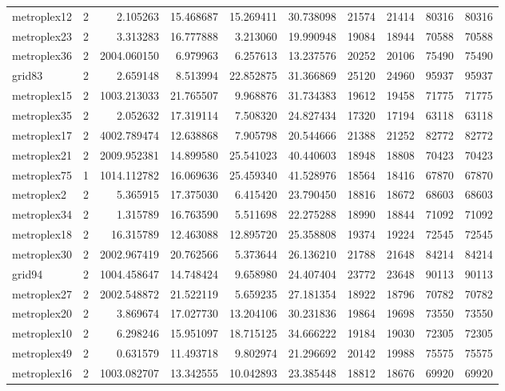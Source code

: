 \begin{longtable}{|l|r|r|r|r|r|r|r|r|r|}
metroplex12 & 2 & 2.105263 & 15.468687 & 15.269411 & 30.738098 & 21574 & 21414 & 80316 & 80316 \\
metroplex23 & 2 & 3.313283 & 16.777888 & 3.213060 & 19.990948 & 19084 & 18944 & 70588 & 70588 \\
metroplex36 & 2 & 2004.060150 & 6.979963 & 6.257613 & 13.237576 & 20252 & 20106 & 75490 & 75490 \\
grid83 & 2 & 2.659148 & 8.513994 & 22.852875 & 31.366869 & 25120 & 24960 & 95937 & 95937 \\
metroplex15 & 2 & 1003.213033 & 21.765507 & 9.968876 & 31.734383 & 19612 & 19458 & 71775 & 71775 \\
metroplex35 & 2 & 2.052632 & 17.319114 & 7.508320 & 24.827434 & 17320 & 17194 & 63118 & 63118 \\
metroplex17 & 2 & 4002.789474 & 12.638868 & 7.905798 & 20.544666 & 21388 & 21252 & 82772 & 82772 \\
metroplex21 & 2 & 2009.952381 & 14.899580 & 25.541023 & 40.440603 & 18948 & 18808 & 70423 & 70423 \\
metroplex75 & 1 & 1014.112782 & 16.069636 & 25.459340 & 41.528976 & 18564 & 18416 & 67870 & 67870 \\
metroplex2 & 2 & 5.365915 & 17.375030 & 6.415420 & 23.790450 & 18816 & 18672 & 68603 & 68603 \\
metroplex34 & 2 & 1.315789 & 16.763590 & 5.511698 & 22.275288 & 18990 & 18844 & 71092 & 71092 \\
metroplex18 & 2 & 16.315789 & 12.463088 & 12.895720 & 25.358808 & 19374 & 19224 & 72545 & 72545 \\
metroplex30 & 2 & 2002.967419 & 20.762566 & 5.373644 & 26.136210 & 21788 & 21648 & 84214 & 84214 \\
grid94 & 2 & 1004.458647 & 14.748424 & 9.658980 & 24.407404 & 23772 & 23648 & 90113 & 90113 \\
metroplex27 & 2 & 2002.548872 & 21.522119 & 5.659235 & 27.181354 & 18922 & 18796 & 70782 & 70782 \\
metroplex20 & 2 & 3.869674 & 17.027730 & 13.204106 & 30.231836 & 19864 & 19698 & 73550 & 73550 \\
metroplex10 & 2 & 6.298246 & 15.951097 & 18.715125 & 34.666222 & 19184 & 19030 & 72305 & 72305 \\
metroplex49 & 2 & 0.631579 & 11.493718 & 9.802974 & 21.296692 & 20142 & 19988 & 75575 & 75575 \\
metroplex16 & 2 & 1003.082707 & 13.342555 & 10.042893 & 23.385448 & 18812 & 18676 & 69920 & 69920 \\

\end{longtable}
